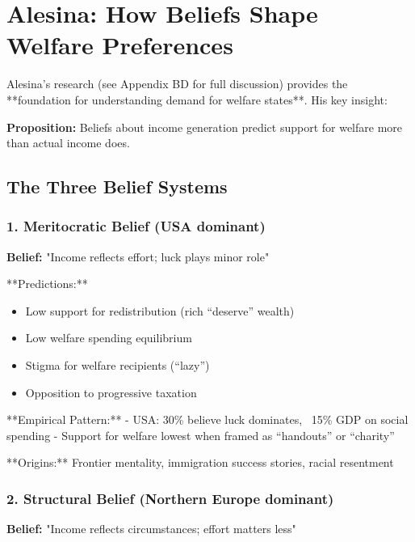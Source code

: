 
\section{Alesina: How Beliefs Shape Welfare Preferences}
\label{sec:alesina-welfare}

Alesina's research (see Appendix BD for full discussion) provides the **foundation for understanding demand for welfare states**. His key insight:

\textbf{Proposition:} Beliefs about income generation predict support for welfare more than actual income does.

\subsection{The Three Belief Systems}

\subsubsection{1. Meritocratic Belief (USA dominant)}

\textbf{Belief:} "Income reflects effort; luck plays minor role"

**Predictions:**
\begin{itemize}
\item Low support for redistribution (rich ``deserve'' wealth)
\item Low welfare spending equilibrium
\item Stigma for welfare recipients (``lazy'')
\item Opposition to progressive taxation
\end{itemize}

**Empirical Pattern:**
- USA: 30\% believe luck dominates, ~15\% GDP on social spending
- Support for welfare lowest when framed as ``handouts'' or ``charity''

**Origins:** Frontier mentality, immigration success stories, racial resentment

\subsubsection{2. Structural Belief (Northern Europe dominant)}

\textbf{Belief:} "Income reflects circumstances; effort matters less"

